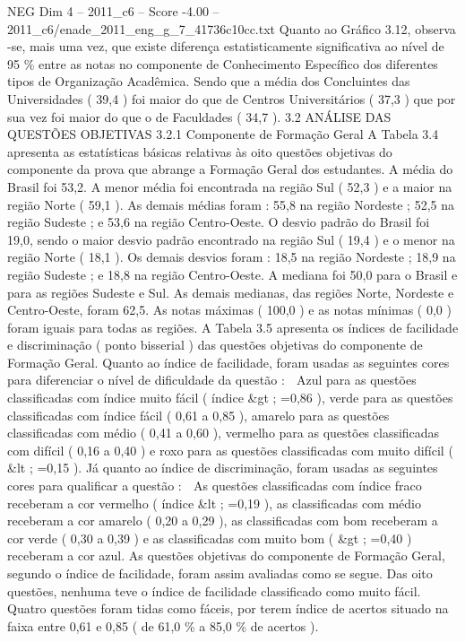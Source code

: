 \begin{textsample}{NEG Dim 4 – 2011\_c6 – Score -4.00 – 2011\_c6/enade\_2011\_eng\_g\_7\_41736c10cc.txt}
Quanto ao Gráfico 3.12, observa -se, mais uma vez, que existe diferença estatisticamente significativa ao nível de 95 \% entre as notas no componente de Conhecimento Específico dos diferentes tipos de Organização Acadêmica.
Sendo que a média dos Concluintes das Universidades ( 39,4 ) foi maior do que de Centros Universitários ( 37,3 ) que por sua vez foi maior do que o de Faculdades ( 34,7 ). 3.2 ANÁLISE DAS QUESTÕES OBJETIVAS 3.2.1 Componente de Formação Geral A Tabela 3.4 apresenta as estatísticas básicas relativas às oito questões objetivas do componente da prova que abrange a Formação Geral dos estudantes.
A média do Brasil foi 53,2.
A menor média foi encontrada na região Sul ( 52,3 ) e a maior na região Norte ( 59,1 ).
As demais médias foram : 55,8 na região Nordeste ; 52,5 na região Sudeste ; e 53,6 na região Centro-Oeste.
O desvio padrão do Brasil foi 19,0, sendo o maior desvio padrão encontrado na região Sul ( 19,4 ) e o menor na região Norte ( 18,1 ).
Os demais desvios foram : 18,5 na região Nordeste ; 18,9 na região Sudeste ; e 18,8 na região Centro-Oeste.
A mediana foi 50,0 para o Brasil e para as regiões Sudeste e Sul.
As demais medianas, das regiões Norte, Nordeste e Centro-Oeste, foram 62,5.
As notas máximas ( 100,0 ) e as notas mínimas ( 0,0 ) foram iguais para todas as regiões.
A Tabela 3.5 apresenta os índices de facilidade e discriminação ( ponto bisserial ) das questões objetivas do componente de Formação Geral.
Quanto ao índice de facilidade, foram usadas as seguintes cores para diferenciar o nível de dificuldade da questão :  Azul para as questões classificadas com índice muito fácil ( índice \&gt ; =0,86 ), verde para as questões classificadas com índice fácil ( 0,61 a 0,85 ), amarelo para as questões classificadas com médio ( 0,41 a 0,60 ), vermelho para as questões classificadas com difícil ( 0,16 a 0,40 ) e roxo para as questões classificadas com muito difícil ( \&lt ; =0,15 ).
Já quanto ao índice de discriminação, foram usadas as seguintes cores para qualificar a questão :  As questões classificadas com índice fraco receberam a cor vermelho ( índice \&lt ; =0,19 ), as classificadas com médio receberam a cor amarelo ( 0,20 a 0,29 ), as classificadas com bom receberam a cor verde ( 0,30 a 0,39 ) e as classificadas com muito bom ( \&gt ; =0,40 ) receberam a cor azul.
As questões objetivas do componente de Formação Geral, segundo o índice de facilidade, foram assim avaliadas como se segue.
Das oito questões, nenhuma teve o índice de facilidade classificado como muito fácil.
Quatro questões foram tidas como fáceis, por terem índice de acertos situado na faixa entre 0,61 e 0,85 ( de 61,0 \% a 85,0 \% de acertos ).

\end{textsample}
